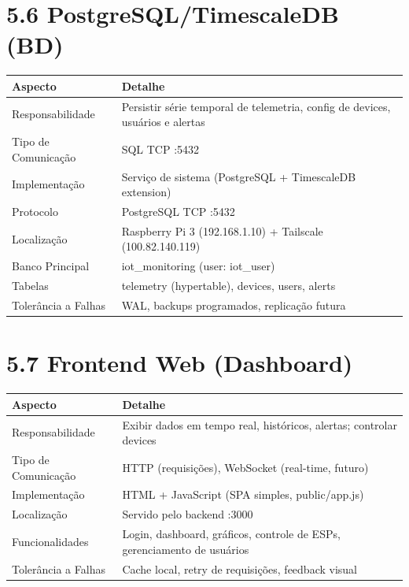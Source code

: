 \documentclass[12pt,a4paper,oneside]{report}
\begin{document}
\section{5.6 PostgreSQL/TimescaleDB (BD)}

\begin{center}
\begin{tabular}{|m{3cm}|m{10cm}|}
    \hline
    \rowcolor{lightblue}
    \textbf{Aspecto} & \textbf{Detalhe} \\
    \hline
    Responsabilidade & Persistir série temporal de telemetria, config de devices, usuários e alertas \\
    \hline
    Tipo de Comunicação & SQL TCP :5432 \\
    \hline
    Implementação & Serviço de sistema (PostgreSQL + TimescaleDB extension) \\
    \hline
    Protocolo & PostgreSQL TCP :5432 \\
    \hline
    Localização & Raspberry Pi 3 (192.168.1.10) + Tailscale (100.82.140.119) \\
    \hline
    Banco Principal & iot\_monitoring (user: iot\_user) \\
    \hline
    Tabelas & telemetry (hypertable), devices, users, alerts \\
    \hline
    Tolerância a Falhas & WAL, backups programados, replicação futura \\
    \hline
\end{tabular}
\end{center}

\section{5.7 Frontend Web (Dashboard)}

\begin{center}
\begin{tabular}{|m{3cm}|m{10cm}|}
    \hline
    \rowcolor{lightblue}
    \textbf{Aspecto} & \textbf{Detalhe} \\
    \hline
    Responsabilidade & Exibir dados em tempo real, históricos, alertas; controlar devices \\
    \hline
    Tipo de Comunicação & HTTP (requisições), WebSocket (real-time, futuro) \\
    \hline
    Implementação & HTML + JavaScript (SPA simples, public/app.js) \\
    \hline
    Localização & Servido pelo backend :3000 \\
    \hline
    Funcionalidades & Login, dashboard, gráficos, controle de ESPs, gerenciamento de usuários \\
    \hline
    Tolerância a Falhas & Cache local, retry de requisições, feedback visual \\
    \hline
\end{tabular}
\end{center}
\end{document}
